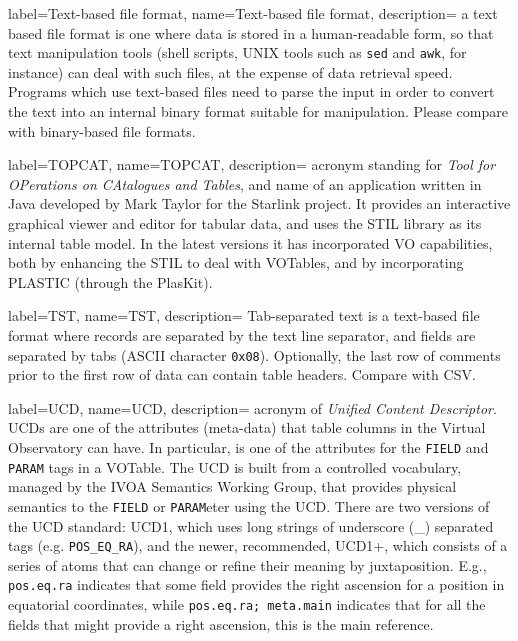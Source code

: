 {
    label={Text-based file format},
    name={Text-based file format},
    description={
    	a text based file format is one where data is stored in a
        human-readable form, so that text manipulation tools (shell
        scripts, UNIX tools such as \texttt{sed} and \texttt{awk}, for
        instance) can deal with such files, at the expense of data
        retrieval speed. Programs which use text-based files need to
        parse the input in order to convert the text into an internal
        binary format suitable for manipulation. Please compare with
        \gls{binary-based file formats}.
    }
}

{
    label={TOPCAT},
    name={TOPCAT},
    description={
    	acronym standing for \emph{Tool for OPerations on CAtalogues
        and Tables}, and name of an application written in \gls{Java}
        developed by Mark Taylor for the \gls{Starlink project}. It
        provides an interactive graphical viewer and editor for tabular
        data, and uses the \gls{STIL} library as its internal table
        model. In the latest versions it has incorporated \gls{VO}
        capabilities, both by enhancing the STIL to deal with
        \gls{VOTables}, and by incorporating \gls{PLASTIC} (through the
        \gls{PlasKit}).
    }
}

{
    label={TST},
    name={TST},
    description={
    	Tab-separated text is a \gls{text-based file format} where
        records are separated by the text line separator, and fields
        are separated by tabs (\gls{ASCII} character \texttt{0x08}).
        Optionally, the last row of comments prior to the first row of
        data can contain table headers. Compare with \gls{CSV}.
    }
}

{
    label={UCD},
    name={UCD},
    description={
    	acronym of \emph{Unified Content Descriptor}. UCDs are one of
        the attributes (meta-data) that table columns in the
        \gls{Virtual Observatory} can have. In particular, is one of
        the attributes for the \texttt{FIELD} and \texttt{PARAM} tags
        in a \gls{VOTable}. The UCD is built from a controlled
        vocabulary, managed by the \gls{IVOA Semantics Working Group},
        that provides physical semantics to the \texttt{FIELD} or
        \texttt{PARAM}eter using the UCD. There are two versions of the
        UCD standard: UCD1, which uses long strings of underscore (_)
        separated tags (e.g. \texttt{POS_EQ_RA}), and the newer,
        recommended, UCD1+, which consists of a series of atoms that
        can change or refine their meaning by juxtaposition. E.g.,
        \texttt{pos.eq.ra} indicates that some field provides the right
        ascension for a position in equatorial coordinates, while
        \texttt{pos.eq.ra; meta.main} indicates that for all the fields
        that might provide a right ascension, this is the main
        reference.
    }
}

